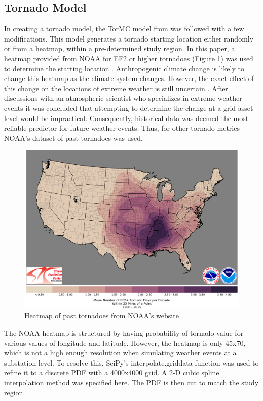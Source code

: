 \documentclass[12pt]{article}
\begin{document}
\subsection{Tornado Model} \label{Tornado Gen}
In creating a tornado model, the TorMC model from \cite{strader} was followed with a few modifications. This model generates a tornado starting location either randomly or from a heatmap, within a pre-determined study region. In this paper, a heatmap provided from NOAA \cite{noaa} for EF2 or higher tornadoes (Figure \ref{fig:noaaheatmap})  was used to determine the starting location . Anthropogenic climate change is likely to change this heatmap as the climate system changes. However, the exact effect of this change on the locations of extreme weather is still uncertain \cite{cheng}. After discussions with an atmospheric scientist who specializes in extreme weather events it was concluded that attempting to determine the change at a grid asset level would be impractical. Consequently, historical data was deemed the most reliable predictor for future weather events. Thus, for other tornado metrics NOAA’s dataset of past tornadoes was used. 
\begin{figure}[ht]
    \centering %
    \includegraphics[width=\textwidth]{noaaheatmap.png}
    \caption[Tornado heatmap from the NOAA website]{Heatmap of past tornadoes from NOAA's website \cite{noaa}.}
    \label{fig:noaaheatmap}
\end{figure}
The NOAA heatmap is structured by having probability of tornado value for various values of longitude and latitude. However, the heatmap is only 45x70, which is not a high enough resolution when simulating weather events at a substation level. To resolve this, SciPy’s interpolate.griddata function was used to refine it to a discrete PDF with a 4000x4000 grid. A 2-D cubic spline interpolation method was specified here. The PDF is then cut to match the study region. \par
\end{document}
